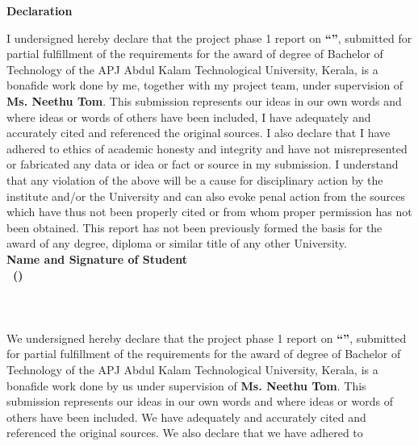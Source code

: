 \newpage
\thispagestyle{empty}
\begin{center}
  \vspace*{1cm}
  \textbf{\large Declaration}
\end{center}
\ifdefined\soloname
I undersigned hereby declare that the project phase 1 report on {\bf``\projtitle''}, submitted for partial fulfillment of the requirements for the award of degree of Bachelor of Technology of the APJ Abdul Kalam Technological University, Kerala, is a bonafide
work done by me, together with my project team, under supervision of {\bf Ms. Neethu Tom}. This submission
represents our ideas in our own words and where ideas or words of others have been included, I have
adequately and accurately cited and referenced the original sources. I also declare that I have adhered to
ethics of academic honesty and integrity and have not misrepresented or fabricated any data or idea or
fact or source in my submission. I understand that any violation of the above will be a cause for
disciplinary action by the institute and/or the University and can also evoke penal action from the sources
which have thus not been properly cited or from whom proper permission has not been obtained. This
report has not been previously formed the basis for the award of any degree, diploma or similar title of
any other University.\vspace{1.3 cm}\\
{{\bf Name and Signature of Student}\vspace{0.5 cm}\\
{ \bf \soloname\ (\soloreg)}}\\[-0.6mm] \\\\\\
\else
We undersigned hereby declare that the project phase 1 report on {\bf``\projtitle''}, submitted for partial fulfillment of the requirements for the award of degree of Bachelor of Technology of the APJ Abdul Kalam Technological University, Kerala, is a bonafide
work done by us under supervision of {\bf Ms. Neethu Tom}. This submission
represents our ideas in our own words and where ideas or words of others have been included. We have
adequately and accurately cited and referenced the original sources. We also declare that we have adhered to
